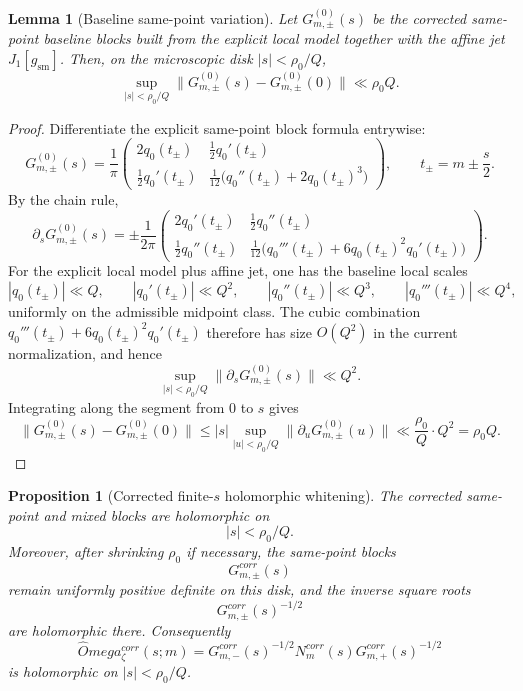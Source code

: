 \documentclass[11pt,a4paper]{amsart}
\def\Omega{Omega}%
\def\corr{corr}%
\theoremstyle{plain}
\newtheorem{proposition}[theorem]{Proposition}
\newtheorem{lemma}[theorem]{Lemma}
\theoremstyle{definition}
\newcommand{\sm}{\mathrm{sm}}
\newcommand{\corr}{\mathrm{corr}}
\begin{document}
\begin{lemma}[Baseline same-point variation]
\label{lem:baseline-variation}
Let $G_{m,\pm}^{(0)}(s)$ be the corrected same-point baseline blocks built
from the explicit local model together with the affine jet $J_1[g_{\sm}]$.
Then, on the microscopic disk $|s|<\rho_0/Q$,
\[
\sup_{|s|<\rho_0/Q}
\|G_{m,\pm}^{(0)}(s)-G_{m,\pm}^{(0)}(0)\|
\ll \rho_0 Q.
\]
\end{lemma}

\begin{proof}
Differentiate the explicit same-point block formula entrywise:
\[
G_{m,\pm}^{(0)}(s)=\frac1\pi
\begin{pmatrix}
2q_0(t_\pm) & \frac12 q_0'(t_\pm)\\[1ex]
\frac12 q_0'(t_\pm) & \frac1{12}\bigl(q_0''(t_\pm)+2q_0(t_\pm)^3\bigr)
\end{pmatrix},
\qquad t_\pm=m\pm \frac{s}{2}.
\]
By the chain rule,
\[
\partial_s G_{m,\pm}^{(0)}(s)
=
\pm \frac1{2\pi}
\begin{pmatrix}
2q_0'(t_\pm) & \frac12 q_0''(t_\pm)\\[1ex]
\frac12 q_0''(t_\pm) &
\frac1{12}\bigl(q_0'''(t_\pm)+6q_0(t_\pm)^2q_0'(t_\pm)\bigr)
\end{pmatrix}.
\]
For the explicit local model plus affine jet, one has the baseline local scales
\[
|q_0(t_\pm)|\ll Q,\qquad
|q_0'(t_\pm)|\ll Q^2,\qquad
|q_0''(t_\pm)|\ll Q^3,\qquad
|q_0'''(t_\pm)|\ll Q^4,
\]
uniformly on the admissible midpoint class. The cubic combination
$
q_0'''(t_\pm)+6q_0(t_\pm)^2q_0'(t_\pm)
$
therefore has size $O(Q^2)$ in the current normalization, and hence
\[
\sup_{|s|<\rho_0/Q}\|\partial_s G_{m,\pm}^{(0)}(s)\|\ll Q^2.
\]
Integrating along the segment from $0$ to $s$ gives
\[
\|G_{m,\pm}^{(0)}(s)-G_{m,\pm}^{(0)}(0)\|
\le
|s|\sup_{|u|<\rho_0/Q}\|\partial_u G_{m,\pm}^{(0)}(u)\|
\ll
\frac{\rho_0}{Q}\cdot Q^2
=
\rho_0 Q.
\]
\end{proof}

\begin{proposition}[Corrected finite-$s$ holomorphic whitening]
\label{prop:corrected-whitening}
The corrected same-point and mixed blocks are holomorphic on
\[
|s|<\rho_0/Q.
\]
Moreover, after shrinking $\rho_0$ if necessary, the same-point blocks
\[
G_{m,\pm}^{\corr}(s)
\]
remain uniformly positive definite on this disk, and the inverse square roots
\[
G_{m,\pm}^{\corr}(s)^{-1/2}
\]
are holomorphic there. Consequently
\[
\widehat\Omega_\zeta^{\corr}(s;m)
=
G_{m,-}^{\corr}(s)^{-1/2}
N_m^{\corr}(s)
G_{m,+}^{\corr}(s)^{-1/2}
\]
is holomorphic on $|s|<\rho_0/Q$.
\end{proposition}
\end{document}
